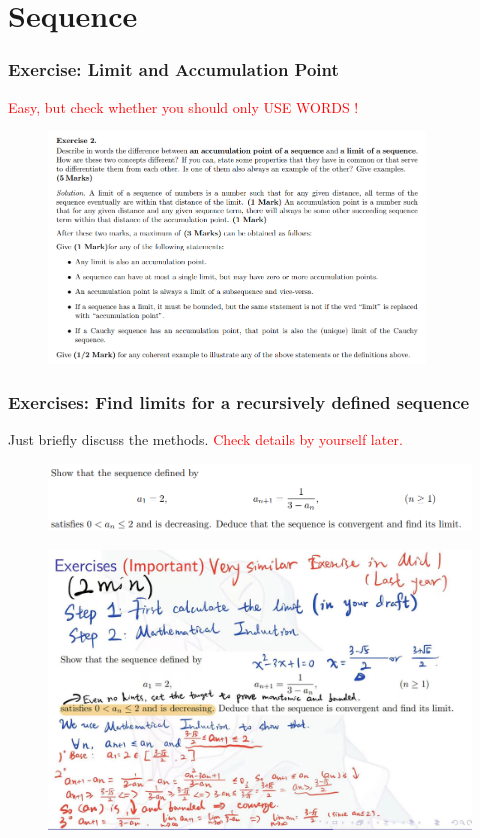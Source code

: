 \documentclass{beamer}
\begin{document}
\section{Sequence}
\begin{frame}
    \frametitle{Exercise: Limit and Accumulation Point}
    \textcolor{red}{Easy, but check whether you should only USE WORDS !}
    \begin{figure}[htbp]
        \centering
        \includegraphics[width=10cm]{concept.png}
    \end{figure}
\end{frame}


\begin{frame}
    \frametitle{Exercises: Find limits for a recursively defined sequence}

    Just briefly discuss the methods. \textcolor{red}{Check details by yourself later.}
    \begin{figure}[htbp]
        \centering
        \includegraphics[width=12cm]{sequenceExercise.png}
    \end{figure}
\end{frame}


\begin{frame}
    \begin{figure}[htbp]
        \centering
        \includegraphics[width=12cm]{answerLimit.png}
    \end{figure}
\end{frame}
\end{document}
